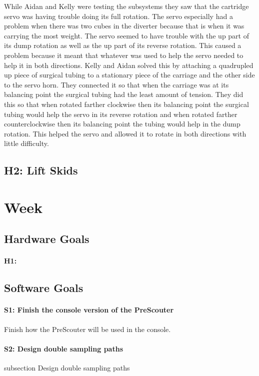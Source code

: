 \documentclass{article}
\begin{document}
While Aidan and Kelly were testing the subsystems they saw that the cartridge servo was having trouble doing its full rotation. The servo especially had a problem when there was two cubes in the diverter because that is when it was carrying the most weight. The servo seemed to have trouble with the up part of its dump rotation as well as the up part of its reverse rotation. This caused a problem because it meant that whatever was used to help the servo needed to help it in both directions. Kelly and Aidan solved this by attaching a quadrupled up piece of surgical tubing to a stationary piece of the carriage and the other side to the servo horn. They connected it so that when the carriage was at its balancing point the surgical tubing had the least amount of tension. They did this so that when rotated farther clockwise then its balancing point the surgical tubing would help the servo in its reverse rotation and when rotated farther counterclockwise then its balancing point the tubing would help in the dump rotation. This helped the servo and allowed it to rotate in both directions with little difficulty.

\subsection{H2: Lift Skids}

\clearpage \newpage \section{Week \thesection} 
\subsection{Hardware Goals}
\paragraph{H1: }

\subsection{Software Goals}
\paragraph{S1: Finish the console version of the PreScouter}
 Finish how the PreScouter will be used in the console.
\paragraph{S2: Design double sampling paths}
subsection {Design double sampling paths}
\end{document}
